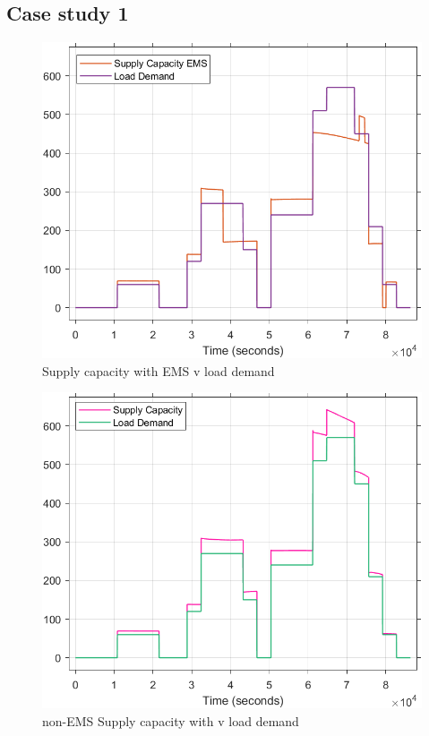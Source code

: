 \subsection{Case study 1}
\begin{figure}[H]
	\centering
	\includegraphics[totalheight=8cm]{Figures/supply capacity with ems v load demand.png}
	\caption{Supply capacity with EMS v load demand}
\end{figure}
\begin{figure}[H]
	\centering
	\includegraphics[totalheight=8cm]{Figures/supply capacity with non-ems v load demand.png}
	\caption{non-EMS Supply capacity with v load demand}
\end{figure}
